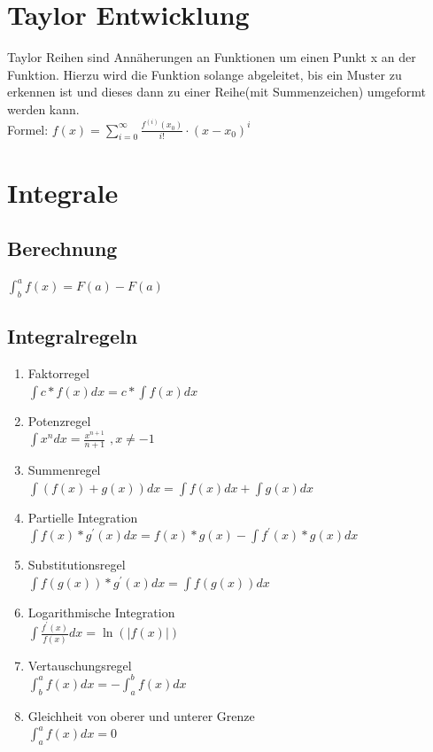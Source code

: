 \documentclass[12pt,a4paper]{article}
\begin{document}
\section{Taylor Entwicklung}
	Taylor Reihen sind Annäherungen an Funktionen um einen Punkt x an der Funktion. Hierzu wird die Funktion solange abgeleitet, bis ein Muster zu erkennen ist und dieses dann zu einer Reihe(mit Summenzeichen) umgeformt werden kann.\\ 
	Formel: $f(x) = \sum_{i = 0}^{\infty} \frac{f^{(i)}(x_0)}{i!} \cdot (x-x_0)^i$

\section{Integrale}
	\subsection{Berechnung}
		$\int^a_b{f(x)} = F(a) - F(a)$

	\subsection{Integralregeln}
		\begin{enumerate}
			\item Faktorregel \\
				$\int {c*f(x)dx} = c * \int {f(x)dx}$
			\item Potenzregel\\
				$\int{x^n}dx = \frac{x^{n+1}}{n+1}$   $, x \ne -1$
			\item Summenregel \\
				$\int {(f(x) + g(x))dx} = \int{f(x)dx} + \int{g(x)dx}$ 
			\item Partielle Integration\\
				$\int{f(x)*g^{'}(x)dx} = f(x)*g(x) - \int{f^{'}(x)*g(x)dx}$
			\item Substitutionsregel \\ 
				$\int{f(g(x)) * g^{'}(x)dx} =\int{f(g(x))dx}$
			\item Logarithmische Integration\\
				$\int{\frac{f^{'}(x)}{f(x)}dx} = \ln{(|f(x)|)} $
			\item Vertauschungsregel \\
				$\int^a_b{f(x)dx} = - \int^b_a{f(x)dx}$
			\item Gleichheit von oberer und unterer Grenze \\
				$\int^a_a{f(x)dx} = 0$
		\end{enumerate}
	
\end{document}
